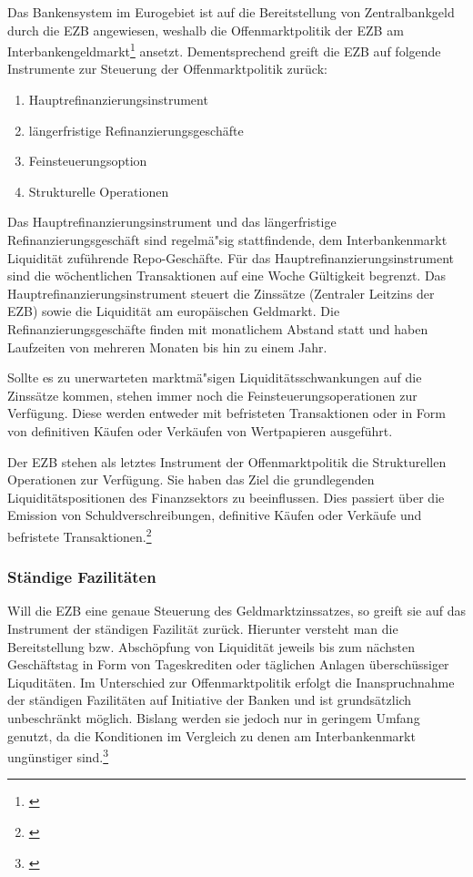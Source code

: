 \documentclass[
        onecolumn,
        a4paper,
        abstracton,
        parskip=half
        ,final
        ]{scrartcl}
\begin{document}
Das Bankensystem im Eurogebiet ist auf die Bereitstellung von Zentralbankgeld durch die EZB angewiesen, weshalb die Offenmarktpolitik der EZB am Interbankengeldmarkt\footnote[53]{\citep*[vgl.][S.558f]{Basseler2010}} ansetzt. Dementsprechend greift die EZB auf folgende Instrumente zur Steuerung der Offenmarktpolitik zur{\"u}ck:
\begin{enumerate}
 \item{Hauptrefinanzierungsinstrument}
 \item{l{\"a}ngerfristige Refinanzierungsgesch{\"a}fte}
 \item{Feinsteuerungsoption}
 \item{Strukturelle Operationen}
 \end{enumerate}

Das Hauptrefinanzierungsinstrument und das l{\"a}ngerfristige Refinanzierungsgesch{\"a}ft sind regelm{\"a}{"s}ig stattfindende, dem Interbankenmarkt Liquidit{\"a}t zuf{\"u}hrende Repo-Gesch{\"a}fte.
F{\"u}r das Hauptrefinanzierungsinstrument sind die w{\"o}chentlichen Transaktionen auf eine Woche G{\"u}ltigkeit begrenzt. Das Hauptrefinanzierungsinstrument steuert die Zinss{\"a}tze (Zentraler Leitzins der EZB) sowie die Liquidit{\"a}t am europ{\"a}ischen Geldmarkt. Die Refinanzierungsgesch{\"a}fte finden mit monatlichem Abstand statt und haben  Laufzeiten von mehreren Monaten bis hin zu einem Jahr.

Sollte es zu unerwarteten marktm{\"a}{"s}igen Liquidit{\"a}tsschwankungen auf die Zinss{\"a}tze kommen, stehen immer noch die Feinsteuerungsoperationen zur Verf{\"u}gung. Diese werden entweder mit befristeten Transaktionen oder in Form von definitiven  K{\"a}ufen oder Verk{\"a}ufen von Wertpapieren ausgef{\"u}hrt.

Der EZB stehen als letztes Instrument der Offenmarktpolitik die Strukturellen Operationen zur Verf{\"u}gung. Sie haben das Ziel die grundlegenden Liquidit{\"a}tspositionen des Finanzsektors zu beeinflussen. Dies passiert {\"u}ber die Emission von Schuldverschreibungen, definitive K{\"a}ufen oder Verk{\"a}ufe und befristete Transaktionen.\footnote[58]{\citep*[S.560]{Basseler2010}}

\subsubsection{St{\"a}ndige Fazilit{\"a}ten}  %

Will die EZB eine genaue Steuerung des Geldmarktzinssatzes, so greift sie auf das Instrument der st{\"a}ndigen Fazilit{\"a}t zur{\"u}ck. Hierunter versteht man die Bereitstellung bzw. Absch{\"o}pfung von Liquidit{\"a}t jeweils bis zum n{\"a}chsten Gesch{\"a}ftstag in Form von Tageskrediten oder t{\"a}glichen Anlagen {\"u}bersch{\"u}ssiger Liqudit{\"a}ten. Im Unterschied zur Offenmarktpolitik erfolgt die Inanspruchnahme der st{\"a}ndigen Fazilit{\"a}ten auf Initiative der Banken und ist grunds{\"a}tzlich unbeschr{\"a}nkt m{\"o}glich. Bislang werden sie jedoch nur in geringem Umfang genutzt, da die Konditionen im Vergleich zu denen am Interbankenmarkt ung{\"u}nstiger sind.\footnote[59]{\citep*[vgl.][S.560ff]{Basseler2010}}
\end{document}
